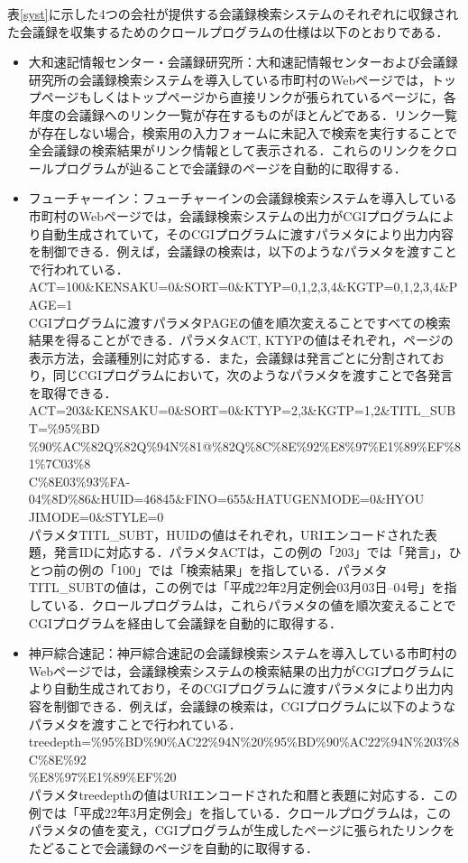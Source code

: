 \documentclass[japanese]{jnlp_1.4}
\begin{document}
表\ref{syst}に示した4つの会社が提供する会議録検索システムのそれぞれに収録された会議録を収集するためのクロールプログラムの仕様は以下のとおりである．
\\
\begin{itemize}
 \item
大和速記情報センター・会議録研究所：大和速記情報センターおよび会議録研究所の会議録検索システムを導入している市町村のWebページでは，トップページもしくはトップページから直接リンクが張られているページに，各年度の会議録へのリンク一覧が存在するものがほとんどである．リンク一覧が存在しない場合，検索用の入力フォームに未記入で検索を実行することで全会議録の検索結果がリンク情報として表示される．これらのリンクをクロールプログラムが辿ることで会議録のページを自動的に取得する．
 \item
フューチャーイン：フューチャーインの会議録検索システムを導入している市町村のWebページでは，会議録検索システムの出力がCGIプログラムにより自動生成されていて，そのCGIプログラムに渡すパラメタにより出力内容を制御できる．例えば，会議録の検索は，以下のようなパラメタを渡すことで行われている．\\[0.5\Cvs]
 ACT=100\&KENSAKU=0\&SORT=0\&KTYP=0,1,2,3,4\&KGTP=0,1,2,3,4\&PAGE=1\\[0.5\Cvs]
CGIプログラムに渡すパラメタPAGEの値を順次変えることですべての検索結果を得ることができる．パラメタACT, KTYPの値はそれぞれ，ページの表示方法，会議種別に対応する．また，会議録は発言ごとに分割されており，同じCGIプログラムにおいて，次のようなパラメタを渡すことで各発言を取得できる．\\[0.5\Cvs]
 ACT=203\&KENSAKU=0\&SORT=0\&KTYP=2,3\&KGTP=1,2\&TITL\_SUBT=\%95\%BD\\\%90\%AC\%82Q\%82Q\%94N\%81@\%82Q\%8C\%8E\%92\%E8\%97\%E1\%89\%EF\%81\%7C03\%8\\C\%8E03\%93\%FA-04\%8D\%86\&HUID=46845\&FINO=655\&HATUGENMODE=0\&HYOU\\JIMODE=0\&STYLE=0\\[0.5\Cvs]
パラメタTITL\_SUBT，HUIDの値はそれぞれ，URIエンコードされた表題，発言IDに対応する．パラメタACTは，この例の「203」では「発言」，ひとつ前の例の「100」では「検索結果」を指している．パラメタTITL\_SUBTの値は，この例では「平成22年2月定例会03月03日--04号」を指している．クロールプログラムは，これらパラメタの値を順次変えることでCGIプログラムを経由して会議録を自動的に取得する．
\item
神戸綜合速記：神戸綜合速記の会議録検索システムを導入している市町村のWebページでは，会議録検索システムの検索結果の出力がCGIプログラムにより自動生成されており，そのCGIプログラムに渡すパラメタにより出力内容を制御できる．例えば，会議録の検索は，CGIプログラムに以下のようなパラメタを渡すことで行われている．\\[0.5\Cvs]
treedepth=\%95\%BD\%90\%AC22\%94N\%20\%95\%BD\%90\%AC22\%94N\%203\%8C\%8E\%92\\\%E8\%97\%E1\%89\%EF\%20\\[0.5\Cvs]
パラメタtreedepthの値はURIエンコードされた和暦と表題に対応する．この例では「平成22年3月定例会」を指している．クロールプログラムは，このパラメタの値を変え，CGIプログラムが生成したページに張られたリンクをたどることで会議録のページを自動的に取得する．

\end{itemize} 
\end{document}
